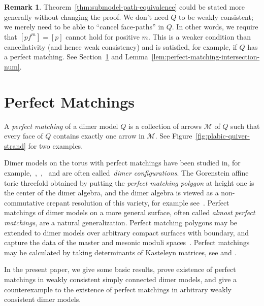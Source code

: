 \documentclass{article}
\theoremstyle{definition}
\newtheorem{remk}[thm]{Remark}
\begin{document}
\begin{remk}
	Theorem~\ref{thm:submodel-path-equivalence} could be stated more generally without changing the proof. We don't need $Q$ to be weakly consistent; we merely need to be able to ``cancel face-paths'' in $Q$. In other words, we require that $[pf^m]=[p]$ cannot hold for positive $m$. This is a weaker condition than cancellativity (and hence weak consistency) and is satisfied, for example, if $Q$ has a perfect matching. See Section~\ref{sec:perfect-matching} and  Lemma~\ref{lem:perfect-matching-intersection-num}.
\end{remk}




\section{Perfect Matchings}\label{sec:perfect-matching}
	A \textit{perfect matching} of a dimer model $Q$ is a collection of arrows $\mathcal M$ of $Q$ such that every face of $Q$ contains exactly one arrow in $\mathcal M$.
	See Figure~\ref{fig:plabic-quiver-strand} for two examples.

	Dimer models on the torus with perfect matchings have been studied in, for example,~\cite{XIU},~\cite{XBroomhead2009},~\cite{XBocklandt2011} and are often called~\textit{dimer configurations}. The Gorenstein affine toric threefold obtained by putting the \emph{perfect matching polygon} at height one is the center of the dimer algebra, and the dimer algebra is viewed as a non-commutative crepant resolution of this variety, for example see~\cite{XBocklandt2015, XBroomhead2009, XIUM, Mozg}.
Perfect matchings of dimer models on a more general surface, often called \textit{almost perfect matchings}, are a natural generalization. {Perfect matching polygons may be extended to dimer models over arbitrary compact surfaces with boundary, and capture the data of the master and mesonic moduli spaces~\cite{BFTFDBPTSA}.}
Perfect matchings may be calculated by taking determinants of Kasteleyn matrices, see \cite{HaK} and \cite[\S5]{BFTFDBPTSA}.

In the present paper, we give some basic results, prove existence of perfect matchings in weakly consistent simply connected dimer models, and give a counterexample to the existence of perfect matchings in arbitrary weakly consistent dimer models.
\end{document}
